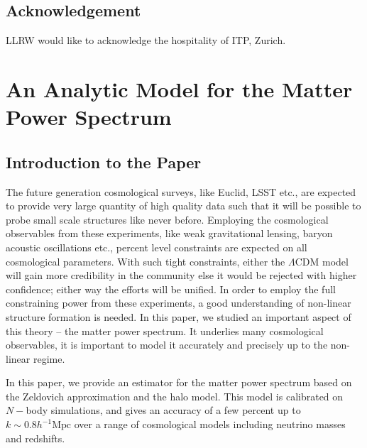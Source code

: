 \documentclass[
  11pt,
  twoside,
  openright,
  titlepage,
  headings=optiontoheadandtoc
]{scrbook}
\begin{document}
\section{Acknowledgement}
LLRW would like to acknowledge the hospitality of ITP, Zurich.


% 


% 



\clearpage



\chapter{An Analytic Model for the Matter Power Spectrum}
\label{p2:chap:analytic-power-spectrum}

\section{Introduction to the Paper}

The future generation cosmological surveys, like Euclid, 
LSST etc., are expected to provide
very large quantity of high quality data such that it will be 
possible to probe small scale structures like never before. Employing 
the cosmological observables from these experiments,
like weak gravitational lensing, baryon acoustic oscillations etc., 
percent level constraints are expected on all cosmological 
parameters. With such tight
constraints, either the $\Lambda$CDM model will gain more credibility
in the community else it would be rejected with higher confidence; either 
way the efforts will be unified. 
In order to employ the full constraining power from these experiments, a good
understanding of non-linear structure formation is needed.
In this paper, we studied an important aspect of this theory -- 
the matter power spectrum. It underlies
many cosmological observables, it is important
to model it accurately and precisely up to the non-linear regime. 

In this paper, we provide an estimator for the matter
power spectrum based on the Zeldovich approximation and the halo model. 
This model is calibrated on $N-$body simulations, and gives
an accuracy of a few percent up to $k\sim 0.8 h^{-1}\mathrm{Mpc}$ 
over a range of cosmological models 
including neutrino masses and redshifts. 
\end{document}
